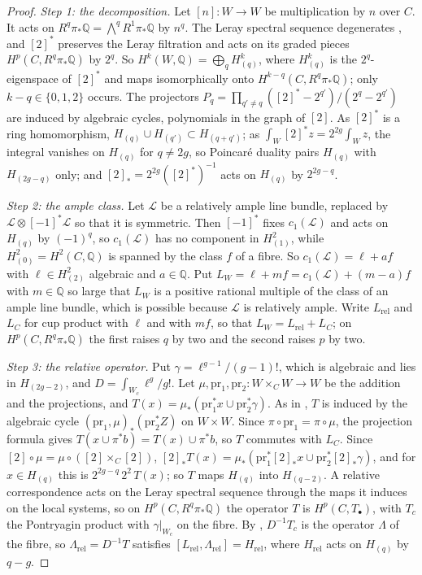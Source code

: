 \documentclass[11pt,reqno]{amsart}
\theoremstyle{plain}
\theoremstyle{definition}
\theoremstyle{remark}
\newcommand{\QQ}{\mathbb{Q}}
\newcommand{\cL}{\mathcal{L}}
\begin{document}
\begin{proof}
\emph{Step 1: the decomposition.} Let $[n]\colon W\to W$ be multiplication
by $n$ over $C$. It acts on $R^{q}\pi_{*}\QQ=\bigwedge^{q}R^{1}\pi_{*}\QQ$ by
$n^{q}$. The Leray spectral sequence degenerates \cite[4.1.1(i)]{Del71}, and
$[2]^{*}$ preserves the Leray filtration and acts on its graded pieces
$H^{p}(C,R^{q}\pi_{*}\QQ)$ by $2^{q}$. So $H^{k}(W,\QQ)=\bigoplus_{q}
H^{k}_{(q)}$, where $H^{k}_{(q)}$ is the $2^{q}$-eigenspace of $[2]^{*}$ and
maps isomorphically onto $H^{k-q}(C,R^{q}\pi_{*}\QQ)$; only $k-q\in\{0,1,2\}$
occurs. The projectors
$P_{q}=\prod_{q'\ne q}([2]^{*}-2^{q'})/(2^{q}-2^{q'})$ are induced by
algebraic cycles, polynomials in the graph of $[2]$. As $[2]^{*}$ is a ring
homomorphism, $H_{(q)}\cup H_{(q')}\subset H_{(q+q')}$; as
$\int_{W}[2]^{*}z=2^{2g}\int_{W}z$, the integral vanishes on $H_{(q)}$ for
$q\ne2g$, so Poincar\'e duality pairs $H_{(q)}$ with $H_{(2g-q)}$ only; and
$[2]_{*}=2^{2g}([2]^{*})^{-1}$ acts on $H_{(q)}$ by $2^{2g-q}$.

\emph{Step 2: the ample class.} Let $\cL$ be a relatively ample line bundle,
replaced by $\cL\otimes[-1]^{*}\cL$ so that it is symmetric. Then $[-1]^{*}$
fixes $c_{1}(\cL)$ and acts on $H_{(q)}$ by $(-1)^{q}$, so $c_{1}(\cL)$ has no
component in $H^{2}_{(1)}$, while $H^{2}_{(0)}=H^{2}(C,\QQ)$ is spanned by the
class $f$ of a fibre. So $c_{1}(\cL)=\ell+af$ with $\ell\in H^{2}_{(2)}$
algebraic and $a\in\QQ$. Put $L_{W}=\ell+mf=c_{1}(\cL)+(m-a)f$ with
$m\in\QQ$ so large that $L_{W}$ is a positive rational multiple of the class
of an ample line bundle, which is possible because $\cL$ is relatively ample.
Write $L_{\mathrm{rel}}$ and $L_{C}$ for cup product with $\ell$ and with
$mf$, so that $L_{W}=L_{\mathrm{rel}}+L_{C}$; on
$H^{p}(C,R^{q}\pi_{*}\QQ)$ the first raises $q$ by two and the second raises
$p$ by two.

\emph{Step 3: the relative operator.} Put $\gamma=\ell^{g-1}/(g-1)!$, which is
algebraic and lies in $H_{(2g-2)}$, and $D=\int_{W_{c}}\ell^{g}/g!$. Let
$\mu,\mathrm{pr}_{1},\mathrm{pr}_{2}\colon W\times_{C}W\to W$ be the addition
and the projections, and $T(x)=\mu_{*}(\mathrm{pr}_{1}^{*}x\cup
\mathrm{pr}_{2}^{*}\gamma)$. As in , $T$ is
induced by the algebraic cycle $(\mathrm{pr}_{1},\mu)_{*}(\mathrm{pr}_{2}^{*}Z)$
on $W\times W$. Since $\pi\circ\mathrm{pr}_{1}=\pi\circ\mu$, the projection
formula gives $T(x\cup\pi^{*}b)=T(x)\cup\pi^{*}b$, so $T$ commutes with
$L_{C}$. Since $[2]\circ\mu=\mu\circ([2]\times_{C}[2])$,
$[2]_{*}T(x)=\mu_{*}(\mathrm{pr}_{1}^{*}[2]_{*}x\cup\mathrm{pr}_{2}^{*}
[2]_{*}\gamma)$, and for $x\in H_{(q)}$ this is
$2^{2g-q}\,2^{2}\,T(x)$; so $T$ maps $H_{(q)}$ into $H_{(q-2)}$. A relative
correspondence acts on the Leray spectral sequence through the maps it
induces on the local systems, so on $H^{p}(C,R^{q}\pi_{*}\QQ)$ the operator
$T$ is $H^{p}(C,T_{\bullet})$, with $T_{c}$ the Pontryagin product with
$\gamma|_{W_{c}}$ on the fibre. By , $D^{-1}T_{c}$
is the operator $\Lambda$ of the fibre, so $\Lambda_{\mathrm{rel}}=D^{-1}T$
satisfies $[L_{\mathrm{rel}},\Lambda_{\mathrm{rel}}]=H_{\mathrm{rel}}$, where
$H_{\mathrm{rel}}$ acts on $H_{(q)}$ by $q-g$.


\end{proof}
\end{document}

